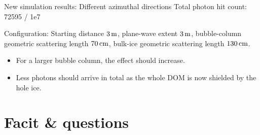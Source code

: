 \begin{frame}[fragile]{New simulation results: Different azimuthal directions}
  \tiny Total photon hit count: 72595 / 1e7

  \tiny Configuration: Starting distance $3\text{\,m}$, plane-wave extent $3\text{\,m}$, bubble-column geometric scattering length $70\text{\,cm}$, bulk-ice geometric scattering length $130\text{\,cm}$.
  \normalsize

  \begin{itemize}
    \item For a larger bubble column, the effect should increase. \checkmark
    \item Less photons should arrive in total \tiny as the whole DOM is now shielded by the hole ice. \normalsize \checkmark
  \end{itemize}
\end{frame}

\section{Facit \& questions}
